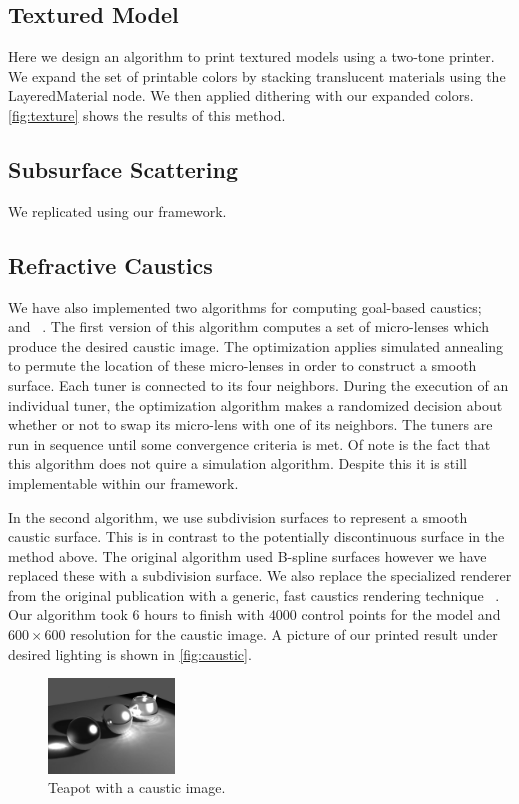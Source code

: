 \documentclass[annual]{acmsiggraph}
\begin{document}
\subsection{Textured Model}
Here we design an algorithm to print textured models using a two-tone printer. We expand the set of printable colors by stacking translucent materials using the LayeredMaterial node. We then applied dithering with our expanded colors. \autoref{fig:texture} shows the results of this method.
\subsection{Subsurface Scattering}
We replicated \cite{Hasan:2010} using our framework. 

\subsection{Refractive Caustics}
We have also implemented two algorithms for computing goal-based caustics;  ~\cite{Marios:2011} and ~\cite{Finckh:2010}.
The first version of this algorithm computes  a set of micro-lenses which produce the desired caustic image. 
The optimization applies simulated annealing to permute the location of these micro-lenses in order to construct a smooth surface.
Each tuner is connected to its four neighbors.
During the execution of an individual tuner, the optimization algorithm makes a randomized decision about
 whether or not to swap its micro-lens with one of its neighbors.
The tuners are run in sequence until some convergence criteria is met.
Of note is the fact that this algorithm does not quire a simulation algorithm. 
Despite this it is still implementable within our framework. 

In the second algorithm, we use subdivision surfaces to represent a smooth caustic surface. 
This is in contrast to the potentially discontinuous surface in the method above. 
The original algorithm used B-spline surfaces however we have replaced these with a subdivision surface. 
We also replace the specialized renderer from the original publication with a generic, fast caustics rendering technique ~\cite{Yuksel:2009}. Our algorithm took 6 hours to finish with $4000$ control points for the model and $600\times 600$ resolution for the caustic image.  A picture of our printed result under desired lighting is shown in \autoref{fig:caustic}.
\begin{figure}
	\centering
 	\includegraphics[width=0.3\textwidth]{figure/caustic.jpg}
\caption{Teapot with a caustic image.}
\label{fig:caustic}
\end{figure}
\end{document}
